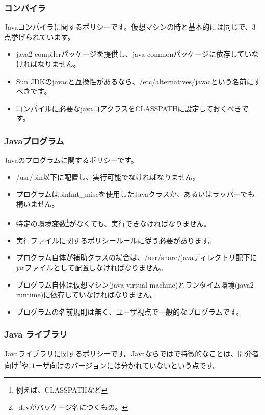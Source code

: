 \documentclass[mingoth,a4paper]{jsarticle}
\begin{document}
\subsubsection{コンパイラ}
Javaコンパイラに関するポリシーです。仮想マシンの時と基本的には同じで、3点挙げられています。
\begin{itemize}
\item java2-compilerパッケージを提供し、java-commonパッケージに依存していなければなりません。
\item Sun JDKのjavacと互換性があるなら、/etc/alternatives/javacという名前にすべきです。
\item コンパイルに必要なjavaコアクラスをCLASSPATHに設定しておくべきです。
\end{itemize}

\subsubsection{Javaプログラム}
Javaのプログラムに関するポリシーです。
\begin{itemize}
\item /usr/bin以下に配置し、実行可能でなければなりません。
\item プログラムはbinfmt\_miscを使用したJavaクラスか、あるいはラッパーでも構いません。
\item 特定の環境変数\footnote{例えば、CLASSPATHなど}がなくても、実行できなければなりません。
\item 実行ファイルに関するポリシールールに従う必要があります。
\item プログラム自体が補助クラスの場合は、/usr/share/javaディレクトリ配下にjarファイルとして配置しなければなりません。
\item プログラム自体は仮想マシン(java-virtual-machine)とランタイム環境(java2-runtime)に依存していなければなりません。
\item プログラムの名前規則は無く、ユーザ視点で一般的なプログラムです。
\end{itemize}

\subsubsection{Java ライブラリ}
Javaライブラリに関するポリシーです。Javaならではで特徴的なことは、開発者向け\footnote{-devがパッケージ名につくもの。}やユーザ向けのバージョンには分かれていないという点です。
\end{document}
